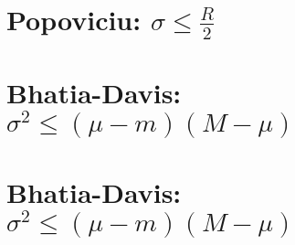 \begin{spacing}{1.2}
\section*{Popoviciu: $\sigma\le\frac{R}{2}$} \label{DBuno3Mo}
\Mo{

}
\vspace{0.5cm}
\newpage
\section*{Bhatia-Davis: $\sigma^2\le (\mu-m)(M-\mu)$} \label{DBuno4}
\Fa{

}
\vspace{0.5cm}
\newpage
\section*{Bhatia-Davis: $\sigma^2\le (\mu-m)(M-\mu)$} \label{DBuno4Mo}
\Mo{

}
\vspace{0.5cm}
\newpage

\end{spacing}


